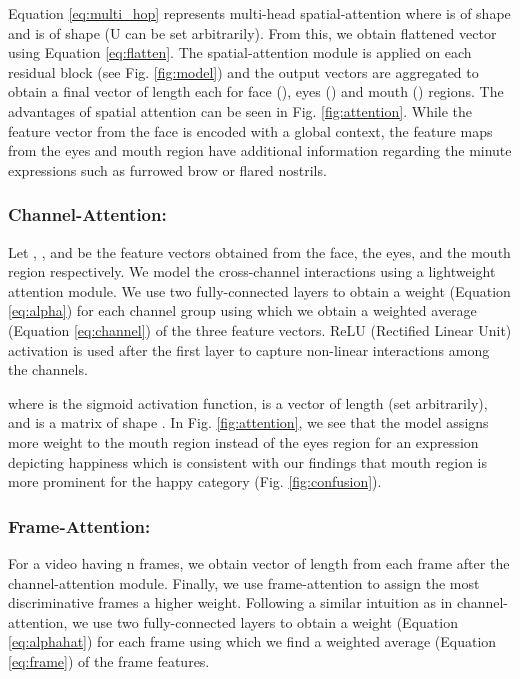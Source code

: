 \documentclass[runningheads]{llncs}
\begin{document}
Equation \ref{eq:multi_hop} represents multi-head spatial-attention where  is of shape  and  is of shape  (U can be set arbitrarily). From this, we obtain flattened vector  using Equation \ref{eq:flatten}. The spatial-attention module is applied on each residual block (see Fig. \ref{fig:model}) and the output vectors are aggregated to obtain a final vector of length  each for face (), eyes () and mouth () regions. The advantages of spatial attention can be seen in Fig. \ref{fig:attention}. While the feature vector from the face is encoded with a global context, the feature maps from the eyes and mouth region have additional information regarding the minute expressions such as furrowed brow or flared nostrils.



\subsubsection{Channel-Attention:} \label{sec: channel}
Let , , and  be the feature vectors obtained from the face, the eyes, and the mouth region respectively. We model the cross-channel interactions using a lightweight attention module. We use two fully-connected layers to obtain a weight  (Equation \ref{eq:alpha}) for each channel group using which we obtain a weighted average  (Equation \ref{eq:channel}) of the three feature vectors. ReLU (Rectified Linear Unit) activation is used after the first layer to capture non-linear interactions among the channels.



where  is the sigmoid activation function,  is a vector of length  (set arbitrarily), and  is a matrix of shape . In Fig. \ref{fig:attention}, we see that the model assigns more weight to the mouth region instead of the eyes region for an expression depicting happiness which is consistent with our findings that mouth region is more prominent for the happy category (Fig. \ref{fig:confusion}).

\subsubsection{Frame-Attention:} \label{sec: frame}
For a video having n frames, we obtain vector  of length  from each frame after the channel-attention module. Finally, we use frame-attention to assign the most discriminative frames a higher weight. Following a similar intuition as in channel-attention, we use two fully-connected layers to obtain a weight  (Equation \ref{eq:alphahat}) for each frame using which we find a weighted average  (Equation \ref{eq:frame}) of the frame features.
\end{document}
